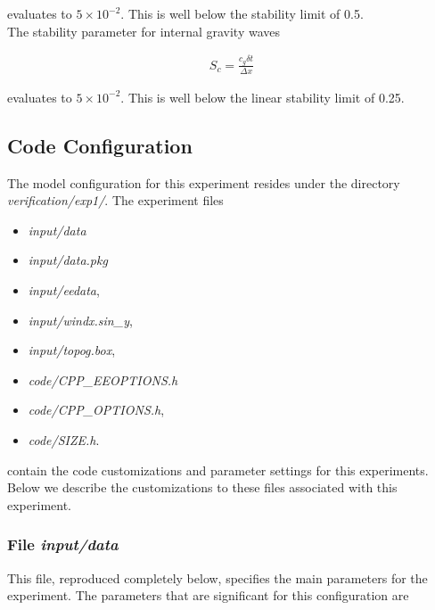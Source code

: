 \noindent evaluates to $5 \times 10^{-2}$. This is well below the stability 
limit of 0.5.
\\

\noindent The stability parameter for internal gravity waves 
\cite{adcroft:95}

\begin{eqnarray}
\label{EQ:eg-simple-tracer-igw_stability}
S_{c} = \frac{c_{g} \delta t}{ \Delta x}
\end{eqnarray}

\noindent evaluates to $5 \times 10^{-2}$. This is well below the linear
stability limit of 0.25.
  
\subsection{Code Configuration}
\label{www:tutorials}
\label{SEC:code_config}

The model configuration for this experiment resides under the 
directory {\it verification/exp1/}.  The experiment files 
\begin{itemize}
\item {\it input/data}
\item {\it input/data.pkg}
\item {\it input/eedata},
\item {\it input/windx.sin\_y},
\item {\it input/topog.box},
\item {\it code/CPP\_EEOPTIONS.h}
\item {\it code/CPP\_OPTIONS.h},
\item {\it code/SIZE.h}. 
\end{itemize}
contain the code customizations and parameter settings for this 
experiments. Below we describe the customizations
to these files associated with this experiment.

\subsubsection{File {\it input/data}}
\label{www:tutorials}

This file, reproduced completely below, specifies the main parameters 
for the experiment. The parameters that are significant for this configuration
are

